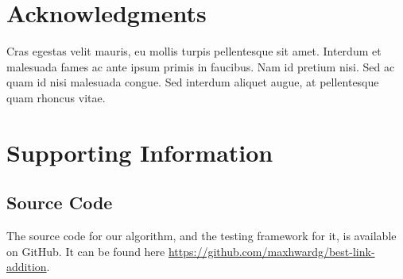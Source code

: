 \documentclass[10pt,letterpaper]{article}
\begin{document}
\section*{Acknowledgments}
Cras egestas velit mauris, eu mollis turpis pellentesque sit amet. Interdum et malesuada fames ac ante ipsum primis in faucibus. Nam id pretium nisi. Sed ac quam id nisi malesuada congue. Sed interdum aliquet augue, at pellentesque quam rhoncus vitae.

\nolinenumbers

%
%
% 




\section*{Supporting Information}

\label{S1_sourcecode}
\subsection*{Source Code}
The source code for our algorithm, and the testing framework for it, is available on GitHub. It can be found here \url{https://github.com/maxhwardg/best-link-addition}.
\end{document}
